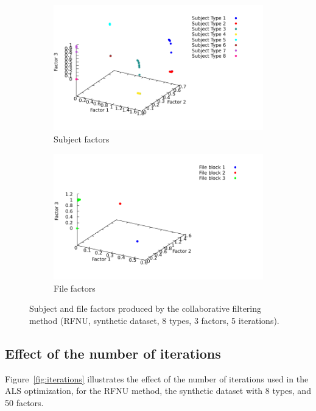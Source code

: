 \documentclass[10pt, conference, compsocconf]{IEEEtran}
\begin{document}
\begin{figure}[h]
\begin{subfigure}{\columnwidth}
\includegraphics[width=0.9\columnwidth]{./data/results/latent-factors/5i-3f-ALS-r1-08-userFactors.pdf}
\caption{Subject factors}
\end{subfigure}
\begin{subfigure}{\columnwidth}
\includegraphics[width=0.9\columnwidth]{./data/results/latent-factors/5i-3f-ALS-r1-08-itemFactors.pdf}
\caption{File factors}
\end{subfigure}
\caption{Subject and file factors produced by the collaborative filtering method (RFNU, synthetic dataset, 8 types, 3 factors, 5 iterations).}
\label{fig:factors3d}
\end{figure}

\subsection{Effect of the number of iterations}
Figure~\ref{fig:iterations} illustrates the effect of the number of 
iterations used in the ALS optimization, for the 
RFNU method, the synthetic dataset with 8 types, and 50 factors. 
\end{document}
